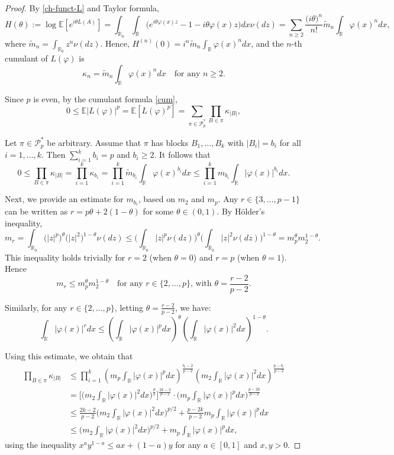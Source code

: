 \documentclass[12pt]{article}
\def\cP{\mathcal{P}}
\def\bE{\mathbb{E}}
\def\bR{\mathbb{R}}
\def\k{\kappa}
\begin{document}
\begin{proof}
By \eqref{ch-funct-L} and Taylor formula,
\[
H(\theta):=\log \bE[e^{i \theta L(A)}]=\int_{\bR_0}\int_{\bR}\big(e^{i \theta \varphi(x)z} -1-i\theta \varphi(x) z\big) dx\nu(dz)=\sum_{n \geq 2} \frac{\big(i\theta \big)^n}{n!} \widetilde{m}_n \int_{\bR} \varphi(x)^n dx,
\]
where $\widetilde{m}_n=\int_{\bR_0} z^n \nu(dz)$. Hence, $H^{(n)}(0)=i^n \widetilde{m}_n \int_{\bR} \varphi(x)^n dx$, and the $n$-th cumulant of $L(\varphi)$ is 
\[
\k_n= \widetilde{m}_n \int_{\bR} \varphi(x)^n dx \quad \mbox{for any $n\geq 2$}.
\]

Since $p$ is even, by the cumulant formula \eqref{cum},
\begin{equation}
\label{mom-LA1}
0\leq \bE|L(\varphi)|^p=\bE[L(\varphi)^p]=\sum_{\pi \in \cP_p^*} \prod_{B \in \pi} \k_{|B|},
\end{equation}


Let $\pi \in \cP_p^*$ be arbitrary. Assume that $\pi$ has blocks $B_1,\ldots,B_k$ with $|B_i|=b_i$ for all $i=1,\ldots,k$. Then $\sum_{i=1}^k b_i=p$ and $b_i \geq 2$. It follows that
\[
0\leq \prod_{B \in \pi} \k_{|B|}=\prod_{i=1}^{k}\k_{b_i}=\prod_{i=1}^{k}\widetilde{m}_{b_i} \int_{\bR} \varphi(x)^{b_i}dx \leq  \prod_{i=1}^{k}m_{b_i} \int_{\bR} |\varphi(x)|^{b_i}dx .
\]

Next, we provide an estimate for $m_{b_i}$, based on $m_2$ and $m_p$.
Any $r \in \{3,\ldots,p-1\}$ can be written as $r=p\theta+2(1-\theta)$ for some $\theta \in (0,1)$.  By H\"older's inequality,
\[
m_r=\int_{\bR_0} \big(|z|^{p} \big)^{\theta} \big(|z|^{2} \big)^{1-\theta}\nu(dz) \leq 
\Big(\int_{\bR_0} |z|^{p} \nu(dz) \Big)^{\theta} \Big(\int_{\bR_0}|z|^{2} \nu(dz)\Big)^{1-\theta}=m_{p}^{\theta}m_2^{1-\theta}.
\]
This inequality holds trivially for $r=2$ (when $\theta=0$) and  $r=p$ (when $\theta=1$). Hence
\[
m_r \leq m_{p}^{\theta} m_2^{1-\theta}  \quad \mbox{for any $r \in \{2,\ldots,p\}$, with $\theta=\frac{r-2}{p-2}$.} 
\]

Similarly, for any $r \in \{2,\ldots,p\}$, letting $\theta=\frac{r-2}{p-2}$, we have:
\[
\int_{\bR} |\varphi(x)|^r dx \leq \left( \int_{\bR} |\varphi(x)|^p dx \right)^{\theta}
\left( \int_{\bR} |\varphi(x)|^2 dx \right)^{1-\theta}. 
\]

Using this estimate, we obtain that
\begin{align}
\nonumber
\prod_{B \in \pi} \k_{|B|} & \leq  \prod_{i=1}^{k}\left(m_{p}  \int_{\bR} |\varphi(x)|^p dx\right)^{\frac{b_i-2}{p-2}} \left(m_{2} \int_{\bR} |\varphi(x)|^2 dx\right)^{\frac{p-b_i}{p-2}}\\
\nonumber
&= \Big[\Big(m_2 \int_{\bR} |\varphi(x)|^2 dx \Big)^{\frac{p}{2}}\Big]^{\frac{2k-2}{p-2}} \cdot \big(m_p \int_{\bR} |\varphi(x)|^p dx \big)^{\frac{p-2k}{p-2}} \\
\nonumber
&\leq \frac{2k-2}{p-2} \Big(m_2 \int_{\bR} |\varphi(x)|^2 dx \Big)^{p/2}+\frac{p-2k}{p-2} m_p \int_{\bR} |\varphi(x)|^p dx\\
\label{mom-LA2}
&\leq  \Big(m_2  \int_{\bR} |\varphi(x)|^2 dx\Big)^{p/2}+m_p  \int_{\bR} |\varphi(x)|^p dx,
\end{align}
using the inequality $x^a y^{1-a} \leq ax+(1-a)y$ for any $a \in [0,1]$ and $x,y>0$. 




\end{proof}
\end{document}
